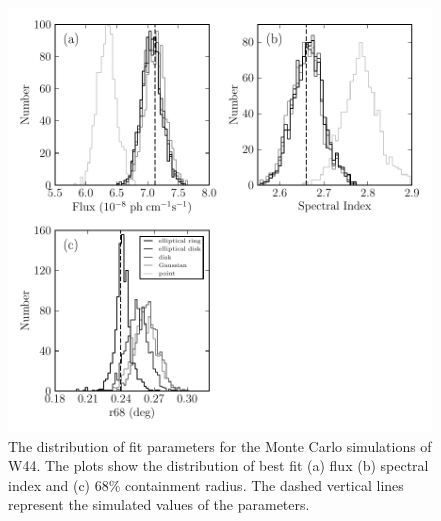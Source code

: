 \begin{figure}
    \includegraphics{mc_plots/bias_w44sim_bw.pdf}
    \fi
    \caption{
    The distribution of fit parameters
    for the Monte Carlo simulations of W44.
    The plots show the distribution of 
    best fit (a) flux (b) spectral index and (c) 68\% containment
    radius. The dashed vertical lines represent
    the simulated values of the parameters.
    }
\end{figure}


